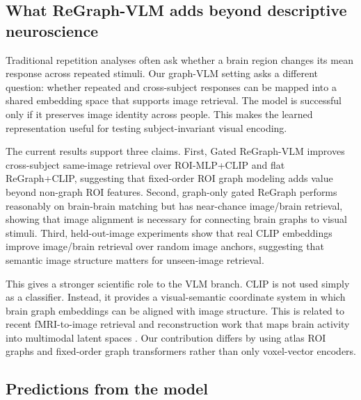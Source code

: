 \documentclass{article}
\begin{document}
\subsection{What ReGraph-VLM adds beyond descriptive neuroscience}

Traditional repetition analyses often ask whether a brain region changes its mean response across repeated stimuli. Our graph-VLM setting asks a different question: whether repeated and cross-subject responses can be mapped into a shared embedding space that supports image retrieval. The model is successful only if it preserves image identity across people. This makes the learned representation useful for testing subject-invariant visual encoding.

The current results support three claims. First, Gated ReGraph-VLM improves cross-subject same-image retrieval over ROI-MLP+CLIP and flat ReGraph+CLIP, suggesting that fixed-order ROI graph modeling adds value beyond non-graph ROI features. Second, graph-only gated ReGraph performs reasonably on brain-brain matching but has near-chance image/brain retrieval, showing that image alignment is necessary for connecting brain graphs to visual stimuli. Third, held-out-image experiments show that real CLIP embeddings improve image/brain retrieval over random image anchors, suggesting that semantic image structure matters for unseen-image retrieval.

This gives a stronger scientific role to the VLM branch. CLIP is not used simply as a classifier. Instead, it provides a visual-semantic coordinate system in which brain graph embeddings can be aligned with image structure. This is related to recent fMRI-to-image retrieval and reconstruction work that maps brain activity into multimodal latent spaces \citep{scotti2023mindeye}. Our contribution differs by using atlas ROI graphs and fixed-order graph transformers rather than only voxel-vector encoders.

\subsection{Predictions from the model}
\end{document}
